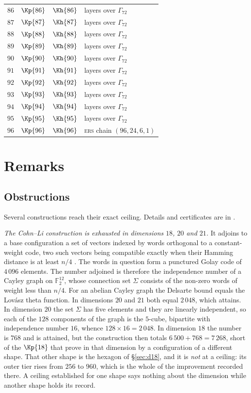 \documentclass[11pt]{amsart}
\theoremstyle{remark}
\newcommand{\Gsz}{\Gamma_{72}}
\begin{document}
\begin{longtable}{rrrl}
$86$ & $\Kp{86}$ & $\Kh{86}$ & layers over $\Gsz$\\
$87$ & $\Kp{87}$ & $\Kh{87}$ & layers over $\Gsz$\\
$88$ & $\Kp{88}$ & $\Kh{88}$ & layers over $\Gsz$\\
$89$ & $\Kp{89}$ & $\Kh{89}$ & layers over $\Gsz$\\
$90$ & $\Kp{90}$ & $\Kh{90}$ & layers over $\Gsz$\\
$91$ & $\Kp{91}$ & $\Kh{91}$ & layers over $\Gsz$\\
$92$ & $\Kp{92}$ & $\Kh{92}$ & layers over $\Gsz$\\
$93$ & $\Kp{93}$ & $\Kh{93}$ & layers over $\Gsz$\\
$94$ & $\Kp{94}$ & $\Kh{94}$ & layers over $\Gsz$\\
$95$ & $\Kp{95}$ & $\Kh{95}$ & layers over $\Gsz$\\
$96$ & $\Kp{96}$ & $\Kh{96}$ & \textsc{ers} chain $(96,24,6,1)$\\
\end{longtable}

\section{Remarks}\label{sec:remarks}

\subsection{Obstructions}\label{ss:obstructions}

Several constructions reach their exact ceiling. Details and certificates are in
\cite{repo}.

\emph{The Cohn--Li construction is exhausted in dimensions $18$, $20$ and $21$.}
It adjoins to a base configuration a set of vectors indexed by words orthogonal
to a constant-weight code, two such vectors being compatible exactly when their
Hamming distance is at least $n/4$ \cite{cohn-li2024}. The words in question form
a punctured Golay code of $4\,096$ elements. The number adjoined is therefore the
independence number of a Cayley graph on $\mathbb F_2^{12}$, whose connection set
$\Sigma$ consists of the non-zero words of weight less than $n/4$. For an
abelian Cayley graph the Delsarte bound equals the Lov\'asz theta function. In
dimensions $20$ and $21$ both equal $2\,048$, which \cite{cohn-li2024} attains.
In dimension $20$ the set $\Sigma$ has five elements and they are linearly
independent, so each of the $128$ components of the graph is the $5$-cube,
bipartite with independence number $16$, whence $128\times16=2\,048$. In dimension
$18$ the number is $768$ and is attained, but the construction then totals
$6\,500+768=7\,268$, short of the $\Kp{18}$ that \cite{cohn-li2024} prove in that
dimension by a configuration of a different shape. That other shape is the hexagon
of \S\ref{sec:d18}, and it is \emph{not} at a ceiling: its outer tier rises from
$256$ to $960$, which is the whole of the improvement recorded there. A ceiling
established for one shape says nothing about the dimension while another shape
holds its record.
\end{document}
